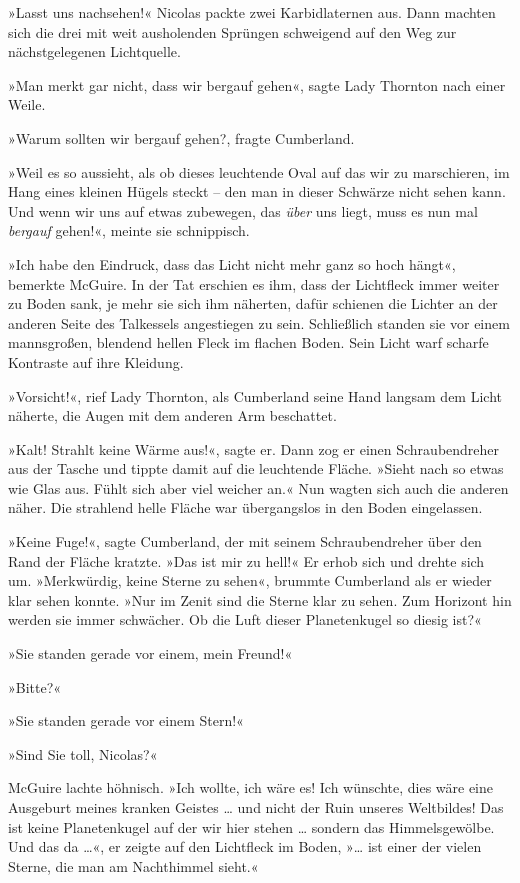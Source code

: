 »Lasst uns nachsehen!« Nicolas packte zwei Karbidlaternen aus. Dann
machten sich die drei mit weit ausholenden Sprüngen schweigend auf
den Weg zur nächstgelegenen Lichtquelle.

»Man merkt gar nicht, dass wir bergauf gehen«, sagte Lady Thornton
nach einer Weile.

»Warum sollten wir bergauf gehen?, fragte Cumberland.

»Weil es so aussieht, als ob dieses leuchtende Oval auf das wir zu
marschieren, im Hang eines kleinen Hügels steckt – den man in
dieser Schwärze nicht sehen kann. Und wenn wir uns auf etwas
zubewegen, das \emph{über} uns liegt, muss es nun mal
\emph{bergauf} gehen!«, meinte sie schnippisch.

»Ich habe den Eindruck, dass das Licht nicht mehr ganz so hoch
hängt«, bemerkte McGuire. In der Tat erschien es ihm, dass der
Lichtfleck immer weiter zu Boden sank, je mehr sie sich ihm
näherten, dafür schienen die Lichter an der anderen Seite des
Talkessels angestiegen zu sein. Schließlich standen sie vor einem
mannsgroßen, blendend hellen Fleck im flachen Boden. Sein Licht
warf scharfe Kontraste auf ihre Kleidung.

»Vorsicht!«, rief Lady Thornton, als Cumberland seine Hand langsam
dem Licht näherte, die Augen mit dem anderen Arm beschattet.

»Kalt! Strahlt keine Wärme aus!«, sagte er. Dann zog er einen
Schraubendreher aus der Tasche und tippte damit auf die leuchtende
Fläche. »Sieht nach so etwas wie Glas aus. Fühlt sich aber viel
weicher an.« Nun wagten sich auch die anderen näher. Die strahlend
helle Fläche war übergangslos in den Boden eingelassen.

»Keine Fuge!«, sagte Cumberland, der mit seinem Schraubendreher
über den Rand der Fläche kratzte. »Das ist mir zu hell!« Er erhob
sich und drehte sich um. »Merkwürdig, keine Sterne zu sehen«,
brummte Cumberland als er wieder klar sehen konnte. »Nur im Zenit
sind die Sterne klar zu sehen. Zum Horizont hin werden sie immer
schwächer. Ob die Luft dieser Planetenkugel so diesig ist?«

»Sie standen gerade vor einem, mein Freund!«

»Bitte?«

»Sie standen gerade vor einem Stern!«

»Sind Sie toll, Nicolas?«

\bigpar

McGuire lachte höhnisch. »Ich wollte, ich wäre es! Ich wünschte,
dies wäre eine Ausgeburt meines kranken Geistes … und nicht der
Ruin unseres Weltbildes! Das ist keine Planetenkugel auf der wir
hier stehen … sondern das Himmelsgewölbe. Und das da …«, er zeigte
auf den Lichtfleck im Boden, »… ist einer der vielen Sterne, die
man am Nachthimmel sieht.«

